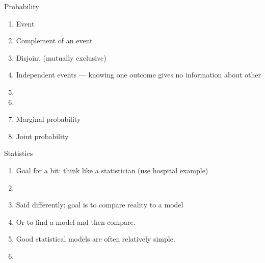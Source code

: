 \documentclass{article}
\begin{document}
Probability
\begin{enumerate}
\item Event
\item Complement of an event
\item Disjoint (mutually exclusive)
\item Independent events --- knowing one outcome gives no information about other
\item {}
\item {}
\item Marginal probability
\item Joint probability
\end{enumerate}

Statistics
\begin{enumerate}
\item Goal for a bit: think like a statistician (use hospital example)
\item {}
\item Said differently: goal is to compare reality to a model
\item Or to find a model and then compare.
\item Good statistical models are often relatively simple.
\item {}
\end{enumerate}
\end{document}
